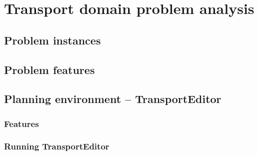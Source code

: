 \chapter{Transport domain problem analysis}

\section{Problem instances}


\section{Problem features}

\section{Planning environment -- TransportEditor}


\subsection{Features}

\subsection{Running TransportEditor}
